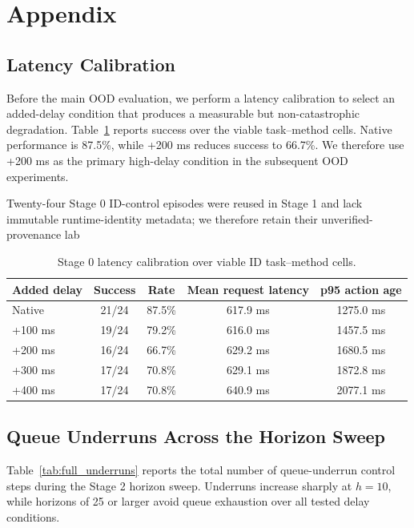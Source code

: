 \documentclass{article}
\begin{document}

\appendix

\section{Appendix}

\subsection{Latency Calibration}

Before the main OOD evaluation, we perform a latency calibration to select an added-delay condition that produces a measurable but non-catastrophic degradation. Table~\ref{tab:calibration} reports success over the viable task--method cells. Native performance is 87.5\%, while +200 ms reduces success to 66.7\%. We therefore use +200 ms as the primary high-delay condition in the subsequent OOD experiments.

Twenty-four Stage 0 ID-control episodes were reused in Stage 1 and lack immutable runtime-identity metadata;
we therefore retain their unverified-provenance lab

\begin{table}[h]
\centering
\small
\caption{Stage 0 latency calibration over viable ID task--method cells.}
\label{tab:calibration}
\begin{tabular}{l|c|c|c|c}
\hline
Added delay & Success & Rate & Mean request latency & p95 action age \\
\hline
Native & 21/24 & 87.5\% & 617.9 ms & 1275.0 ms \\
+100 ms & 19/24 & 79.2\% & 616.0 ms & 1457.5 ms \\
+200 ms & 16/24 & 66.7\% & 629.2 ms & 1680.5 ms \\
+300 ms & 17/24 & 70.8\% & 629.1 ms & 1872.8 ms \\
+400 ms & 17/24 & 70.8\% & 640.9 ms & 2077.1 ms \\
\hline
\end{tabular}
\end{table}

\subsection{Queue Underruns Across the Horizon Sweep}

Table~\ref{tab:full_underruns} reports the total number of queue-underrun control steps during the Stage 2 horizon sweep. Underruns increase sharply at \(h=10\), while horizons of 25 or larger avoid queue exhaustion over all tested delay conditions.
\end{document}
